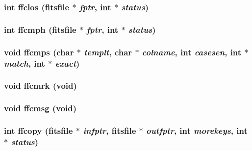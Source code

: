 \subsubsection{\setlength{\rightskip}{0pt plus 5cm}int ffclos (\bf{fitsfile} $\ast$ {\em fptr}, int $\ast$ {\em status})}\label{fitsio_8h_3694602e83c589d28f81a7f11084eb91}


\subsubsection{\setlength{\rightskip}{0pt plus 5cm}int ffcmph (\bf{fitsfile} $\ast$ {\em fptr}, int $\ast$ {\em status})}\label{fitsio_8h_ec95165cf08786dd29ec074042d5809e}


\subsubsection{\setlength{\rightskip}{0pt plus 5cm}void ffcmps (char $\ast$ {\em templt}, char $\ast$ {\em colname}, int {\em casesen}, int $\ast$ {\em match}, int $\ast$ {\em exact})}\label{fitsio_8h_671ff3c44a8c848206e17791c8cbc65e}


\subsubsection{\setlength{\rightskip}{0pt plus 5cm}void ffcmrk (void)}\label{fitsio_8h_5533db69c67737a4a9c44d122183c0d6}


\subsubsection{\setlength{\rightskip}{0pt plus 5cm}void ffcmsg (void)}\label{fitsio_8h_3a25dcb266b12251e531005524b3ed21}


\subsubsection{\setlength{\rightskip}{0pt plus 5cm}int ffcopy (\bf{fitsfile} $\ast$ {\em infptr}, \bf{fitsfile} $\ast$ {\em outfptr}, int {\em morekeys}, int $\ast$ {\em status})}\label{fitsio_8h_05f351dc381335ac165c99c10791f85d}


